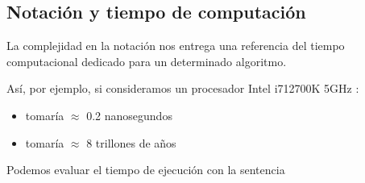 \documentclass[letterpaper,10pt,english]{jupyterBook}
\begin{document}
\subsection{Notación  y tiempo de computación}
\label{\detokenize{1.1-Aspectos_generales/1.1-Aspectos_generales:notacion-big-o-y-tiempo-de-computacion}}
\sphinxAtStartPar
La complejidad en la notación  nos entrega una referencia del tiempo computacional dedicado para un determinado algoritmo.



\sphinxAtStartPar
Así, por ejemplo, si consideramos un procesador Intel i7\sphinxhyphen{}12700K \sphinxhyphen{} 5GHz :
\begin{itemize}
\item {} 
\sphinxAtStartPar
{} tomaría \(\approx\) 0.2 nanosegundos


\item {} 
\sphinxAtStartPar
{} tomaría \(\approx\) 8 trillones de años

\end{itemize}

\sphinxAtStartPar
Podemos evaluar el tiempo de ejecución con la sentencia 
\end{document}
